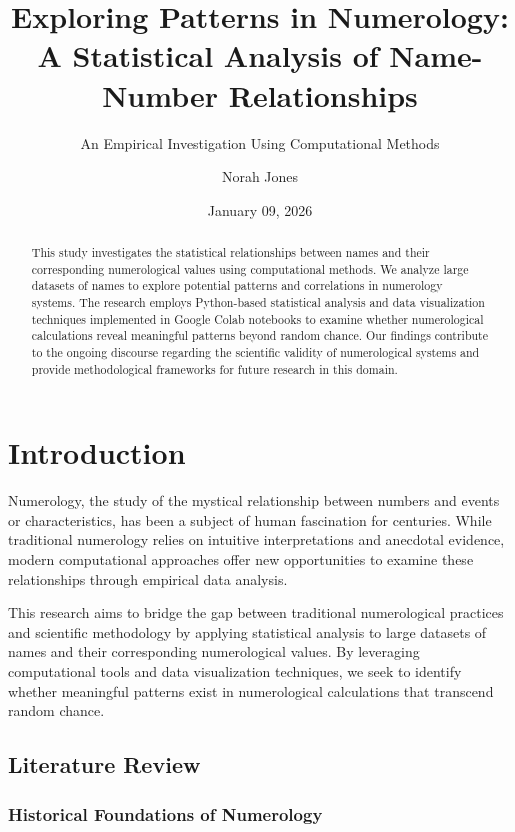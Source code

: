 \documentclass[
  11pt,
]{article}
\title{Exploring Patterns in Numerology: A Statistical Analysis of
Name-Number Relationships}
\subtitle{An Empirical Investigation Using Computational Methods}
\author{Norah Jones}
\date{January 09, 2026}
\begin{document}
\maketitle
\begin{abstract}
This study investigates the statistical relationships between names and
their corresponding numerological values using computational methods. We
analyze large datasets of names to explore potential patterns and
correlations in numerology systems. The research employs Python-based
statistical analysis and data visualization techniques implemented in
Google Colab notebooks to examine whether numerological calculations
reveal meaningful patterns beyond random chance. Our findings contribute
to the ongoing discourse regarding the scientific validity of
numerological systems and provide methodological frameworks for future
research in this domain.
\end{abstract}


\section{Introduction}\label{introduction}

Numerology, the study of the mystical relationship between numbers and
events or characteristics, has been a subject of human fascination for
centuries. While traditional numerology relies on intuitive
interpretations and anecdotal evidence, modern computational approaches
offer new opportunities to examine these relationships through empirical
data analysis.

This research aims to bridge the gap between traditional numerological
practices and scientific methodology by applying statistical analysis to
large datasets of names and their corresponding numerological values. By
leveraging computational tools and data visualization techniques, we
seek to identify whether meaningful patterns exist in numerological
calculations that transcend random chance.

\subsection{Literature Review}\label{literature-review}

\subsubsection{Historical Foundations of
Numerology}\label{historical-foundations-of-numerology}
\end{document}
